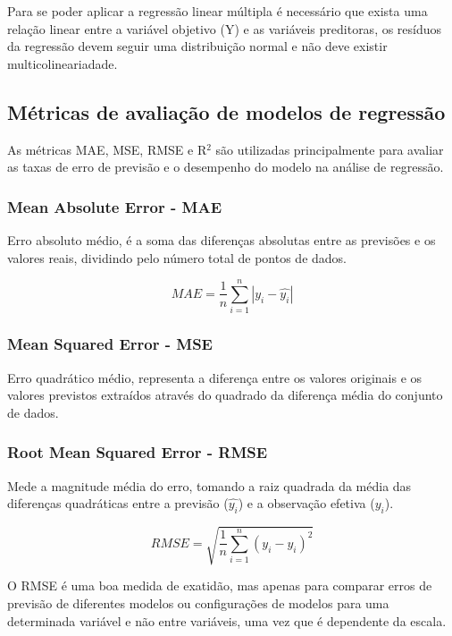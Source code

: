 \documentclass[conference]{IEEEtran}
\begin{document}
Para se poder aplicar a regressão linear múltipla é necessário que exista uma relação linear entre a variável objetivo (Y) e as variáveis preditoras, os resíduos da regressão devem seguir uma distribuição normal e não deve existir multicolineariadade.\cite{madureira2024aed}

\subsection{Métricas de avaliação de modelos de regressão}

As métricas MAE, MSE, RMSE e R$^2$ são utilizadas principalmente para avaliar as taxas de erro de previsão e o desempenho do modelo na análise de regressão.

\medskip
\subsubsection{Mean Absolute Error - MAE}
Erro absoluto médio, é a soma das diferenças absolutas entre as previsões e os valores reais, dividindo pelo número total de pontos de dados.


\begin{equation}
	MAE = \frac{1}{n} {\sum_{i=1}^{n} |y_i - \hat{y_i}|}
	 \label{MAEeq}
\end{equation}

\medskip
\subsubsection{Mean Squared Error - MSE}
Erro quadrático médio, representa a diferença entre os valores originais e os valores previstos extraídos através do quadrado da diferença média do conjunto de dados.

\medskip
\subsubsection{Root Mean Squared Error - RMSE}
Mede a magnitude média do erro, tomando a raiz quadrada da média das diferenças quadráticas entre a previsão ($\hat{y_i}$) e a observação efetiva ($y_i$).


\begin{equation}
	RMSE = \sqrt{\frac{1}{n} {\sum_{i=1}^{n} (y_i - \hat{y_i})^2}}
	\label{RMSEeq}
\end{equation}

O RMSE é uma boa medida de exatidão, mas apenas para comparar erros de previsão de diferentes modelos ou configurações de modelos para uma determinada variável e não entre variáveis, uma vez que é dependente da escala. 
\end{document}
